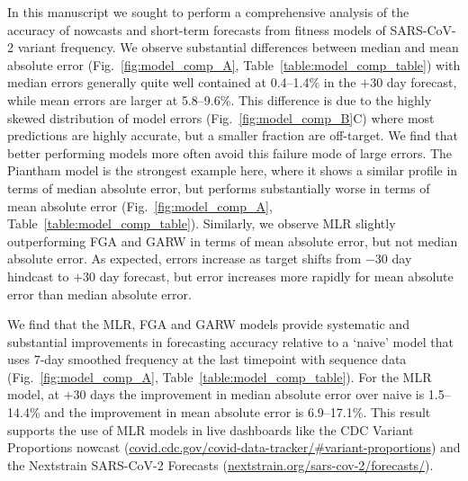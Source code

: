 \documentclass[11pt,oneside,letterpaper]{article}
\begin{document}

In this manuscript we sought to perform a comprehensive analysis of the accuracy of nowcasts and short-term forecasts from fitness models of SARS-CoV-2 variant frequency.
We observe substantial differences between median and mean absolute error (Fig.~\ref{fig:model_comp_A}, Table~\ref{table:model_comp_table}) with median errors generally quite well contained at 0.4--1.4\% in the $+30$ day forecast, while mean errors are larger at 5.8--9.6\%.
This difference is due to the highly skewed distribution of model errors (Fig.~\ref{fig:model_comp_B}C) where most predictions are highly accurate, but a smaller fraction are off-target.
We find that better performing models more often avoid this failure mode of large errors.
The Piantham \cite{piantham2021estimating} model is the strongest example here, where it shows a similar profile in terms of median absolute error, but performs substantially worse in terms of mean absolute error (Fig.~\ref{fig:model_comp_A}, Table~\ref{table:model_comp_table}).
Similarly, we observe MLR slightly outperforming FGA and GARW \cite{figgins2022sars} in terms of mean absolute error, but not median absolute error.
As expected, errors increase as target shifts from $-30$ day hindcast to $+30$ day forecast, but error increases more rapidly for mean absolute error than median absolute error.


\sloppy %
We find that the MLR, FGA and GARW models provide systematic and substantial improvements in forecasting accuracy relative to a `naive' model that uses 7-day smoothed frequency at the last timepoint with sequence data (Fig.~\ref{fig:model_comp_A}, Table~\ref{table:model_comp_table}).
For the MLR model, at $+30$ days the improvement in median absolute error over naive is 1.5--14.4\% and the improvement in mean absolute error is 6.9--17.1\%.
This result supports the use of MLR models in live dashboards like the CDC Variant Proportions nowcast (\href{https://covid.cdc.gov/covid-data-tracker/\#variant-proportions}{covid.cdc.gov/covid-data-tracker/\#variant-proportions}) and the Nextstrain SARS-CoV-2 Forecasts (\href{https://nextstrain.org/sars-cov-2/forecasts/}{nextstrain.org/sars-cov-2/forecasts/}).
\end{document}
